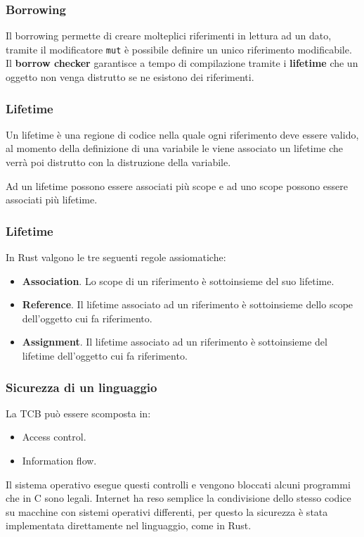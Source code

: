 \documentclass{beamer}
\newcommand{\textcode}[1]{\colorbox{backcolour}{\texttt{#1}}}
\begin{document}
%    

\begin{frame}
    \frametitle{Borrowing}
    Il borrowing permette di creare molteplici riferimenti in lettura ad un dato, tramite il modificatore \textcode{mut} è possibile definire un unico riferimento modificabile.
    Il \textbf{borrow checker} garantisce a tempo di compilazione tramite i \textbf{lifetime} che un oggetto non venga distrutto se ne esistono dei riferimenti.
\end{frame}

%    

\begin{frame}
    \frametitle{Lifetime}
    Un lifetime è una regione di codice nella quale ogni riferimento deve essere valido, al momento della definizione di una variabile le viene associato un lifetime che verrà poi distrutto con la distruzione della variabile.
    
    Ad un lifetime possono essere associati più scope e ad uno scope possono essere associati più lifetime.
\end{frame}

\begin{frame}
    \frametitle{Lifetime}
    In Rust valgono le tre seguenti regole assiomatiche:
    \begin{itemize}
        \item \textbf{Association}. Lo scope di un riferimento è sottoinsieme del suo lifetime. 
        \item \textbf{Reference}. Il lifetime associato ad un riferimento è sottoinsieme dello scope dell'oggetto cui fa riferimento.  
        \item \textbf{Assignment}. Il lifetime associato ad un riferimento è sottoinsieme del lifetime dell'oggetto cui fa riferimento.
    \end{itemize}
\end{frame}

\begin{frame}
    \frametitle{Sicurezza di un linguaggio}
    La TCB può essere scomposta in: 
    \begin{itemize}
        \item Access control.
        \item Information flow.
    \end{itemize}
    Il sistema operativo esegue questi controlli e vengono bloccati alcuni programmi che in C sono legali. 
    Internet ha reso semplice la condivisione dello stesso codice su macchine con sistemi operativi differenti, per questo la sicurezza è stata implementata direttamente nel linguaggio, come in Rust.
\end{frame}
\end{document}
